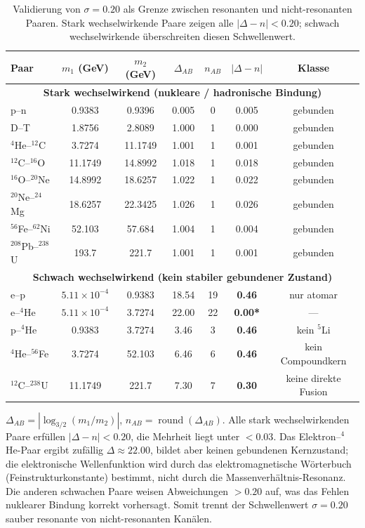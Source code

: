\documentclass[11pt,a4paper]{article}
\theoremstyle{remark}
\begin{document}
	\begin{table}[H]
		\centering
		\caption{Validierung von \(\sigma = 0.20\) als Grenze zwischen resonanten und nicht-resonanten Paaren. Stark wechselwirkende Paare zeigen alle \(|\Delta-n| < 0.20\); schwach wechselwirkende überschreiten diesen Schwellenwert.}
		\label{tab:sigma_validation_heavy}
		\small
		\begin{tabular}{l c c c c c c}
			\toprule
			Paar & \(m_1\) (GeV) & \(m_2\) (GeV) & \(\Delta_{AB}\) & \(n_{AB}\) & \(|\Delta-n|\) & Klasse \\
			\midrule
			\multicolumn{7}{c}{\textbf{Stark wechselwirkend (nukleare / hadronische Bindung)}} \\
			p--n           & 0.9383 & 0.9396 & 0.005  & 0 & 0.005 & gebunden \\
			D--T           & 1.8756 & 2.8089 & 1.000  & 1 & 0.000 & gebunden \\
			$^4$He--$^{12}$C  & 3.7274 & 11.1749& 1.001  & 1 & 0.001 & gebunden \\
			$^{12}$C--$^{16}$O & 11.1749& 14.8992& 1.018  & 1 & 0.018 & gebunden \\
			$^{16}$O--$^{20}$Ne& 14.8992& 18.6257& 1.022  & 1 & 0.022 & gebunden \\
			$^{20}$Ne--$^{24}$Mg& 18.6257& 22.3425& 1.026  & 1 & 0.026 & gebunden \\
			$^{56}$Fe--$^{62}$Ni& 52.103 & 57.684 & 1.004  & 1 & 0.004 & gebunden \\
			$^{208}$Pb--$^{238}$U& 193.7  & 221.7  & 1.001  & 1 & 0.001 & gebunden \\
			\midrule
			\multicolumn{7}{c}{\textbf{Schwach wechselwirkend (kein stabiler gebundener Zustand)}} \\
			e--p           & $5.11\times10^{-4}$ & 0.9383 & 18.54  & 19 & \textbf{0.46} & nur atomar \\
			e--$^4$He      & $5.11\times10^{-4}$ & 3.7274 & 22.00  & 22 & \textbf{0.00*} & — \\
			p--$^4$He      & 0.9383 & 3.7274 & 3.46   & 3  & \textbf{0.46} & kein $^5$Li \\
			$^4$He--$^{56}$Fe & 3.7274 & 52.103 & 6.46   & 6  & \textbf{0.46} & kein Compoundkern \\
			$^{12}$C--$^{238}$U& 11.1749& 221.7  & 7.30   & 7  & \textbf{0.30} & keine direkte Fusion \\
			\bottomrule
		\end{tabular}
		\par\smallskip
		\footnotesize
		\(\Delta_{AB} = |\log_{3/2}(m_1/m_2)|\), \(n_{AB} = \operatorname{round}(\Delta_{AB})\). Alle stark wechselwirkenden Paare erfüllen \(|\Delta-n| < 0.20\), die Mehrheit liegt unter \(<0.03\). Das Elektron--$^4$He-Paar ergibt zufällig \(\Delta\approx22.00\), bildet aber keinen gebundenen Kernzustand; die elektronische Wellenfunktion wird durch das elektromagnetische Wörterbuch (Feinstrukturkonstante) bestimmt, nicht durch die Massenverhältnis-Resonanz. Die anderen schwachen Paare weisen Abweichungen \(>0.20\) auf, was das Fehlen nuklearer Bindung korrekt vorhersagt. Somit trennt der Schwellenwert \(\sigma = 0.20\) sauber resonante von nicht-resonanten Kanälen.
	\end{table}
	
\end{document}
